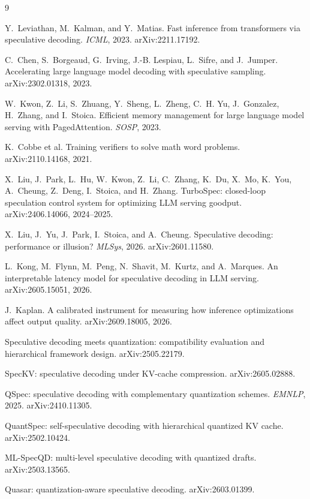\documentclass[11pt]{article}
\begin{document}
\begin{thebibliography}{9}\small

Y.~Leviathan, M.~Kalman, and Y.~Matias.
\newblock Fast inference from transformers via speculative decoding.
\newblock \emph{ICML}, 2023. arXiv:2211.17192.

C.~Chen, S.~Borgeaud, G.~Irving, J.-B. Lespiau, L.~Sifre, and J.~Jumper.
\newblock Accelerating large language model decoding with speculative sampling.
\newblock arXiv:2302.01318, 2023.

W.~Kwon, Z.~Li, S.~Zhuang, Y.~Sheng, L.~Zheng, C.~H. Yu, J.~Gonzalez,
H.~Zhang, and I.~Stoica.
\newblock Efficient memory management for large language model serving with
PagedAttention.
\newblock \emph{SOSP}, 2023.

K.~Cobbe et al.
\newblock Training verifiers to solve math word problems.
\newblock arXiv:2110.14168, 2021.

X.~Liu, J.~Park, L.~Hu, W.~Kwon, Z.~Li, C.~Zhang, K.~Du, X.~Mo, K.~You,
A.~Cheung, Z.~Deng, I.~Stoica, and H.~Zhang.
\newblock TurboSpec: closed-loop speculation control system for optimizing
LLM serving goodput.
\newblock arXiv:2406.14066, 2024--2025.

X.~Liu, J.~Yu, J.~Park, I.~Stoica, and A.~Cheung.
\newblock Speculative decoding: performance or illusion?
\newblock \emph{MLSys}, 2026. arXiv:2601.11580.

L.~Kong, M.~Flynn, M.~Peng, N.~Shavit, M.~Kurtz, and A.~Marques.
\newblock An interpretable latency model for speculative decoding in LLM
serving.
\newblock arXiv:2605.15051, 2026.

J.~Kaplan.
\newblock A calibrated instrument for measuring how inference optimizations
affect output quality.
\newblock arXiv:2609.18005, 2026.

Speculative decoding meets quantization: compatibility evaluation and
hierarchical framework design.
\newblock arXiv:2505.22179.

SpecKV: speculative decoding under KV-cache compression.
\newblock arXiv:2605.02888.

QSpec: speculative decoding with complementary quantization schemes.
\newblock \emph{EMNLP}, 2025. arXiv:2410.11305.

QuantSpec: self-speculative decoding with hierarchical quantized KV cache.
\newblock arXiv:2502.10424.

ML-SpecQD: multi-level speculative decoding with quantized drafts.
\newblock arXiv:2503.13565.

Quasar: quantization-aware speculative decoding.
\newblock arXiv:2603.01399.

\end{thebibliography}
\end{document}
